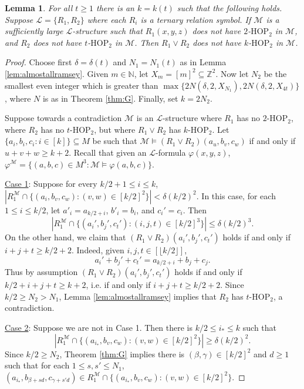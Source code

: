 \documentclass[12pt,oneside,british,a4wide]{amsart}
\newtheorem{lemma}[theorem]{Lemma}
\numberwithin{equation}{section}
\theoremstyle{definition}
\def\HOP{\mathrm{HOP}}
\newcommand{\calL}{\mathcal{L}}
\newcommand{\calM}{\mathcal{M}}
\begin{document}
\begin{lemma}\label{lem:3dim2col}
For all $t\geq 1$ there is an $k=k(t)$ such that the following holds. Suppose $\calL=\{R_1,R_2\}$ where each $R_i$ is a ternary relation symbol.  If $\calM$ is a sufficiently large $\calL$-structure such that $R_1(x,y,z)$ does not have $2$-$\HOP_2$  in $\calM$, and $R_2$ does not have $t$-$\HOP_2$ in $\calM$.  Then $R_1\vee R_2$ does not have $k$-$\HOP_2$ in $\calM$.
\end{lemma}
\begin{proof}

Choose first $\delta=\delta(t)$ and $N_1=N_1(t)$ as in Lemma \ref{lem:almostallramsey}.  Given $m\in \mathbb{N}$, let $X_m=[m]^2\subseteq \mathbb{Z}^2$.  Now let $N_2$ be the smallest even integer which is greater than $\max\{2N(\delta,2,X_{N_1}),2N(\delta,2,X_{4t})\}$, where $N$ is as in Theorem \ref{thm:G}. Finally, set $k=2N_2$.  

Suppose towards a contradiction $\calM$ is an $\calL$-structure where $R_1$ has no $2$-$\HOP_2$, where $R_2$ has no $t$-$\HOP_2$, but where $R_1\vee R_2$ has $k$-$\HOP_2$. Let $\{a_i,b_i,c_i:i\in [k]\}\subseteq M$ be such that $\calM\models (R_1\vee R_2)(a_u,b_v,c_w)$ if and only if $u+v+w\geq k+2$.  Recall that given an $\calL$-formula $\varphi(x,y,z)$, $\varphi^\calM=\{(a,b,c)\in M^3: \calM\models \varphi(a,b,c)\}$.

\underline{Case 1}: Suppose for every $ k/2 +1\leq  i\leq k$, $|R^\calM_1\cap \{(a_i,b_v,c_w): (v,w)\in [ k/2]^2\}|<\delta (k/2)^2$.  In this case, for each $1\leq i\leq k/2$, let $a'_i=a_{k/2 +i}$, $b'_i=b_{i}$, and $c_i'=c_i$.  Then 
$$
|R^\calM_1\cap \{(a_i',b_j',c_t'): (i,j,t)\in [ k/2]^3\}|\leq \delta (k/2)^3.
$$
On the other hand, we claim that $(R_1\vee R_2)(a_i',b_j',c_t')$ holds if and only if $i+j+t\geq k/2+2$.  Indeed, given $i,j,t\in [\lfloor k/2\rfloor]$,
$$
a_i'+b_j'+c_t'=a_{k/2 +i}+b_{j}+c_{j}.
$$
Thus by assumption $(R_1\vee R_2)(a_i',b_j',c_t')$ holds if and only if $k/2+i+j+t\geq k+2$, i.e. if and only if $i+j+t\geq k/2+2$.  Since $k/2\geq N_2>N_1$, Lemma \ref{lem:almostallramsey} implies that $R_2$ has $t$-$\HOP_2$, a contradiction.


\underline{Case 2}: Suppose we are not in Case 1.  Then there is $k/2\leq i_*\leq k$ such that 
$$
|R^\calM_1\cap \{(a_{i_*},b_v,c_w): (v,w)\in [k/2]^2\}|\geq \delta (k/2)^2.
$$
Since $k/2\geq N_2$, Theorem \ref{thm:G} implies there is $(\beta,\gamma)\in [k/2]^2$ and $d\geq 1$ such that for each $1\leq s,s'\leq N_1$, $(a_{i_*},b_{\beta+sd}, c_{\gamma+s'd})\in R^\calM_1\cap \{(a_{i_*},b_v,c_w): (v,w)\in [k/2]^2\}$.  


\end{proof}
\end{document}
